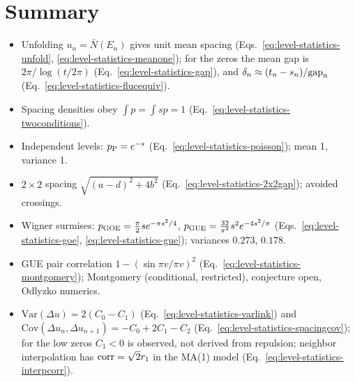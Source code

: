 \section{Summary}\label{sec:level-statistics-summary}
\begin{itemize}
\item Unfolding $u_n=\bar N(E_n)$ gives unit mean spacing (Eqs.~\eqref{eq:level-statistics-unfold}, \eqref{eq:level-statistics-meanone}); for the zeros the mean gap is $2\pi/\log(t/2\pi)$ (Eq.~\eqref{eq:level-statistics-gap}), and $\delta_n\approx(t_n-s_n)/\mathrm{gap}_n$ (Eq.~\eqref{eq:level-statistics-flucequiv}).
\item Spacing densities obey $\int p=\int sp=1$ (Eq.~\eqref{eq:level-statistics-twoconditions}).
\item Independent levels: $p_{\rm P}=e^{-s}$ (Eq.~\eqref{eq:level-statistics-poisson}); mean 1, variance 1.
\item $2\times2$ spacing $\sqrt{(a-d)^2+4b^2}$ (Eq.~\eqref{eq:level-statistics-2x2gap}); avoided crossings.
\item Wigner surmises: $p_{\rm GOE}=\frac\pi2se^{-\pi s^2/4}$, $p_{\rm GUE}=\frac{32}{\pi^2}s^2e^{-4s^2/\pi}$ (Eqs.~\eqref{eq:level-statistics-goe}, \eqref{eq:level-statistics-gue}); variances $0.273$, $0.178$.
\item GUE pair correlation $1-(\sin\pi v/\pi v)^2$ (Eq.~\eqref{eq:level-statistics-montgomery}); Montgomery (conditional, restricted), conjecture open, Odlyzko numerics.
\item $\mathrm{Var}(\Delta u)=2(C_0-C_1)$ (Eq.~\eqref{eq:level-statistics-varlink}) and $\mathrm{Cov}(\Delta u_n,\Delta u_{n+1})=-C_0+2C_1-C_2$ (Eq.~\eqref{eq:level-statistics-spacingcov}); for the low zeros $C_1<0$ is observed, not derived from repulsion; neighbor interpolation has $\mathrm{corr}=\sqrt2r_1$ in the MA(1) model (Eq.~\eqref{eq:level-statistics-interpcorr}).
\end{itemize}

